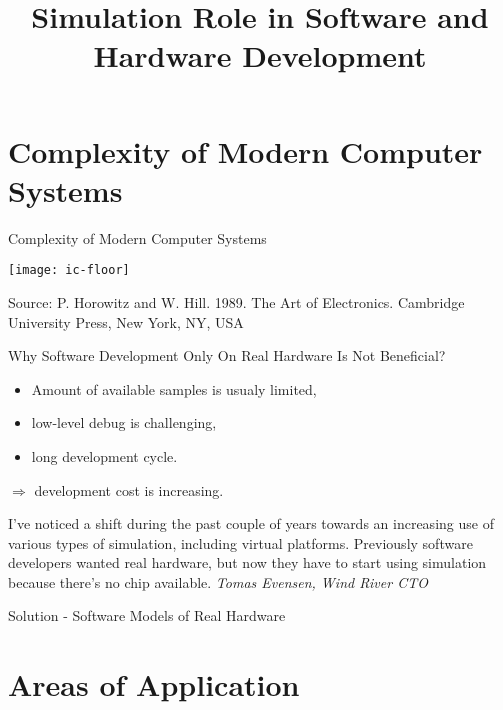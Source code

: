 

\title{Simulation Role in Software and Hardware Development}



\startslides

\section{Complexity of Modern Computer Systems}

\begin{frame}{Complexity of Modern Computer Systems}

\centering
\texttt{[image: ic-floor]}

\tiny{Source: P. Horowitz and W. Hill. 1989. The Art of Electronics. Cambridge
University Press, New York, NY, USA}

\end{frame}

\begin{frame}{Why Software Development Only On Real Hardware Is Not Beneficial?}

\begin{itemize}
\item Amount of available samples is usualy limited,
\item low-level debug is challenging,
\item long development cycle.
\end{itemize}

$\Rightarrow$ development cost is increasing.

\bigskip

\tiny{I've noticed a shift during the past couple of years towards an increasing
use of various types of simulation, including virtual platforms. Previously
software developers wanted real hardware, but now they have to start using
simulation because there's no chip available.
\textit{Tomas Evensen, Wind River CTO}}

\end{frame}

\begin{frame}{Solution - Software Models of Real Hardware}
\centering 
{}

\end{frame}

\section{Areas of Application}

